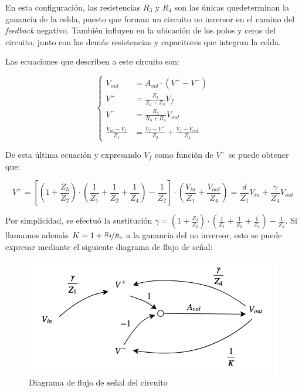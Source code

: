\documentclass[../../tc_tp5_main.tex]{subfiles}
\begin{document}
En esta configuraci\'on, las resistencias $R_3$ y $R_4$ son las \'unicas quedeterminan la ganancia de la celda, puesto que forman un circuito no inversor en el camino del \textit{feedback} negativo. Tambi\'en influyen en la ubicaci\'on de los polos y ceros del circuito, junto con las dem\'as resistencias y capacitores que integran la celda.\par

\newpage
Las ecuaciones que describen a este circuito son: 

\begin{equation}
	\left\{
 	\begin{aligned}
 		V_{out} &= A_{vol} \cdot (V^+ - V^-) \\
 		V^+ &= \frac{Z_2}{Z_2+Z_3} V_f  \\
		V^- &= \frac{R_3}{R_3+R_4} V_{out} \\
		\frac{V_{in} - V_f}{Z_1} &= \frac{V_f - V^+}{Z_2} +\frac{V_f - V_{out}}{Z_4} 
	\end{aligned}
	\right.
 \end{equation}
 
De esta \'ultima ecuaci\'on y expresando $V_f$ como funci\'on de $V^+$ se puede obtener que:

\begin{equation}
	V^+ = \left[ \left(1 + \frac{Z_3}{Z_2}\right) \cdot \left( \frac{1}{Z_1} + \frac{1}{Z_2} + \frac{1}{Z_4}\right) - \frac{1}{Z_2}\right] \cdot
			\left( \frac{V_{in}}{Z_1} + \frac{V_{out}}{Z_4}\right) = \frac{d}{Z_1} V_{in} + \frac{\gamma}{Z_4} V_{out}
\end{equation}

Por simplicidad, se efectu\'o la sustituci\'on $\gamma = \left(1 + \frac{Z_3}{Z_2}\right) \cdot \left( \frac{1}{Z_1} + \frac{1}{Z_2} + \frac{1}{Z_4}\right) - \frac{1}{Z_2}$.
Si llamamos adem\'as $K = 1 + \nicefrac{R_4}{R_3}$ a la ganancia del no inversor, esto se puede expresar mediante el siguiente diagrama de flujo de se\~nal: \par

\begin{figure}[H]
	\centering
	\includegraphics[scale=0.5]{imagenes/tc_tp1_ej1_df_1.png}
	
	\caption{Diagrama de flujo de se\~nal del circuito}
\end{figure}
\end{document}
